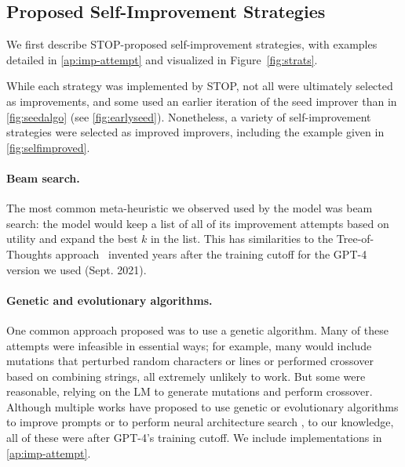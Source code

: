\documentclass{article}
\begin{document}
\subsection{Proposed Self-Improvement Strategies}

We first describe STOP-proposed self-improvement strategies, with examples detailed in \cref{ap:imp-attempt} and visualized in Figure~\ref{fig:strats}. 

While each strategy was implemented by STOP, not all were ultimately selected as improvements, and some used an earlier iteration of the seed improver than in \cref{fig:seedalgo} (see \cref{fig:earlyseed}). Nonetheless, a variety of self-improvement strategies were selected as improved improvers, including the example given in \cref{fig:selfimproved}.  \vspace{-1.6px}

\paragraph{Beam search.} The most common meta-heuristic we observed used by the model was beam search: the model would keep a list of all of its improvement attempts based on utility and expand the best $k$ in the list. This has similarities to the Tree-of-Thoughts approach~\citep{yao2023tree} invented years after the training cutoff for the GPT-4 version we used (Sept. 2021).
\vspace{-1.6px}

\paragraph{Genetic and evolutionary algorithms.} One common approach proposed was to use a genetic algorithm. Many of these attempts were infeasible in essential ways; for example, many would include mutations that perturbed random characters or lines or performed crossover based on combining strings, all extremely unlikely to work. But some were reasonable, relying on the LM to generate mutations and perform crossover. Although multiple works have proposed to use genetic or evolutionary algorithms to improve prompts or to perform neural architecture search \citep{chen2023evoprompting,guo2023connecting}, to our knowledge, all of these were after GPT-4's training cutoff. We include implementations in \cref{ap:imp-attempt}. \vspace{-1.6px}
\end{document}
